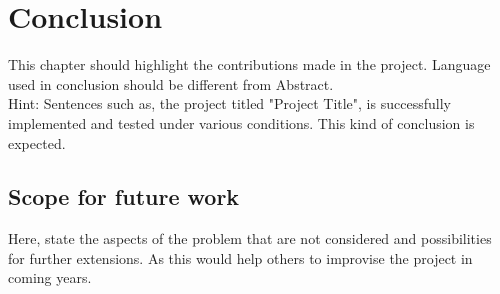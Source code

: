 \chapter{Conclusion}
This chapter should highlight the contributions made in the project. Language used in conclusion should be different from Abstract.\\
Hint: Sentences such as, the project titled "Project Title", is successfully implemented and tested under various conditions. This kind of conclusion is expected.\\

\section{Scope for future work}
Here, state the aspects of the problem that are not considered and possibilities for further extensions. As this would help others to improvise the project in coming years.